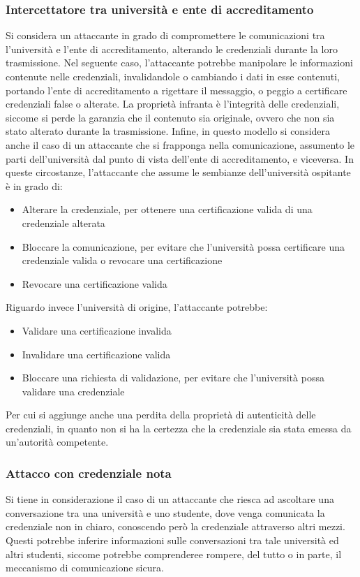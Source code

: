 \documentclass[a4paper,12pt]{article}
\begin{document}
\subsubsection{Intercettatore tra università e ente di accreditamento} Si considera un attaccante in grado di compromettere le comunicazioni tra l'università e l'ente di accreditamento, alterando le credenziali durante la loro trasmissione. Nel seguente caso, l'attaccante potrebbe manipolare le informazioni contenute nelle credenziali, invalidandole o cambiando i dati in esse contenuti, portando l'ente di accreditamento a rigettare il messaggio, o peggio a certificare credenziali false o alterate.
\newline La proprietà infranta è l'integrità delle credenziali, siccome si perde la garanzia che il contenuto sia originale, ovvero che non sia stato alterato durante la trasmissione.
\newline Infine, in questo modello si considera anche il caso di un attaccante che si frapponga nella comunicazione, assumento le parti dell'università dal punto di vista dell'ente di accreditamento, e viceversa. In queste circostanze, l'attaccante che assume le sembianze dell'università ospitante è in grado di:
\begin{itemize}
    \item Alterare la credenziale, per ottenere una certificazione valida di una credenziale alterata
    \item Bloccare la comunicazione, per evitare che l'università possa certificare una credenziale valida o revocare una certificazione
    \item Revocare una certificazione valida
\end{itemize}
Riguardo invece l'università di origine, l'attaccante potrebbe:
\begin{itemize}
    \item Validare una certificazione invalida
    \item Invalidare una certificazione valida
    \item Bloccare una richiesta di validazione, per evitare che l'università possa validare una credenziale
\end{itemize}
Per cui si aggiunge anche una perdita della proprietà di autenticità delle credenziali, in quanto non si ha la certezza che la credenziale sia stata emessa da un'autorità competente.
\subsubsection{Attacco con credenziale nota}
Si tiene in considerazione il caso di un attaccante che riesca ad ascoltare una conversazione tra una università e uno studente, dove venga comunicata la credenziale non in chiaro, conoscendo però la credenziale attraverso altri mezzi. Questi potrebbe inferire informazioni sulle conversazioni tra tale università ed altri studenti, siccome potrebbe comprenderee rompere, del tutto o in parte, il meccanismo di comunicazione sicura.
\end{document}
